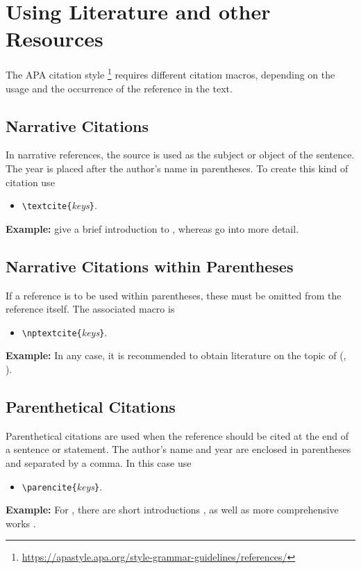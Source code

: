 \chapter[Using Literature]{Using Literature and other Resources}
\label{cha:Literature}

The APA citation style%
\footnote{\url{https://apastyle.apa.org/style-grammar-guidelines/references/}}
requires different citation macros, depending on the usage and the
occurrence of the reference in the text.

\section{Narrative Citations}

In narrative references, the source is used as the subject or object of the sentence. The
year is placed after the author's name in parentheses. To create this kind of citation use 
%
\begin{itemize}
\item[] \verb!\textcite{!\textit{keys}\verb!}!.
\end{itemize}
%
\textbf{Example:}
\textcite{Daniel2018} give a brief introduction to \latex, whereas \textcite{Oetiker2018, Kopka2003} 
go into more detail.


\section{Narrative Citations within Parentheses}

If a reference is to be used within parentheses, these must be omitted from the reference itself. 
The associated macro is
%
\begin{itemize}
\item[] \verb!\nptextcite{!\textit{keys}\verb!}!.
\end{itemize}
%
\textbf{Example:}
In any case, it is recommended to obtain literature on the topic of \latex (\eg, 
).


\section{Parenthetical Citations}

Parenthetical citations are used when the reference should be cited at the end of a sentence or statement.
The author's name and year are enclosed in parentheses and separated by a comma. In this case use
%
\begin{itemize}
\item[] \verb!\parencite{!\textit{keys}\verb!}!.
\end{itemize}
%
\textbf{Example:}
For \latex, there are short introductions \parencite{Daniel2018}, as well as more comprehensive works 
\parencite{Oetiker2018, Kopka2003}.



